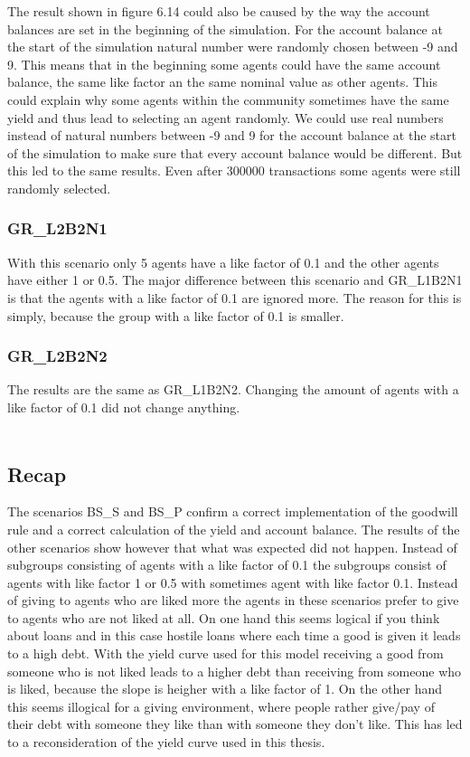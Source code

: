 \documentclass[twoside,openright]{uva-bachelor-thesis}
\begin{document}
The result shown in figure 6.14 could also be caused by the way the account balances are set in the beginning of the simulation. For the account balance at the start of the simulation natural number were randomly chosen between -9 and 9. This means that in the beginning some agents could have the same account balance, the same like factor an the same nominal value as other agents. This could explain why some agents within the community sometimes have the same yield and thus lead to selecting an agent randomly. We could use real numbers instead of natural numbers between -9 and 9 for the account balance at the start of the simulation to make sure that every account balance would be different. But this led to the same results. Even after 300000 transactions some agents were still randomly selected.

\clearpage
\subsubsection{GR\_L2B2N1}
With this scenario only 5 agents have a like factor of 0.1 and the other agents have either 1 or 0.5. The major difference between this scenario and GR\_L1B2N1 is that the agents with a like factor of 0.1 are ignored more. The reason for this is simply, because the group with a like factor of 0.1 is smaller.
\subsubsection{GR\_L2B2N2}
The results are the same as GR\_L1B2N2. Changing the amount of agents with a like factor of 0.1 did not change anything.
\\
\\
\subsection{Recap}
The scenarios BS\_S and BS\_P confirm a correct implementation of the goodwill rule and a correct calculation of the yield and account balance. The results of the other scenarios show however that what was expected did not happen. Instead of subgroups consisting of agents with a like factor of 0.1 the subgroups consist of agents with like factor 1 or 0.5 with sometimes agent with like factor 0.1. Instead of giving to agents who are liked more the agents in these scenarios prefer to give to agents who are not liked at all. On one hand this seems logical if you think about loans and in this case hostile loans where each time a good is given it leads to a high debt. With the yield curve used for this model receiving a good from someone who is not liked leads to a higher debt than receiving from someone who is liked, because the slope is heigher with a like factor of 1. On the other hand this seems illogical for a giving environment, where people rather give/pay of their debt with someone they like than with someone they don't like. This has led to a reconsideration of the yield curve used in this thesis.
\end{document}
